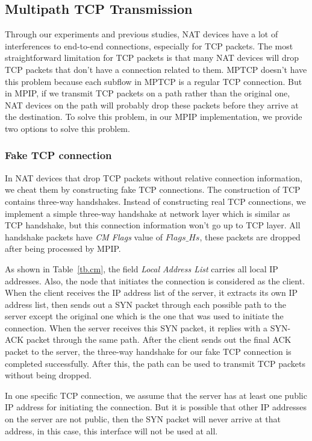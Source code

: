 \subsection{Multipath TCP Transmission}
\label{sec:tcp}
Through our experiments and previous studies\cite{mptcp}, NAT devices have a lot of interferences to end-to-end connections, especially for TCP packets. The most straightforward limitation for TCP packets is that many NAT devices will drop TCP packets that don't have a connection related to them. MPTCP doesn't have this problem because each subflow in MPTCP is a regular TCP connection. But in MPIP, if we transmit TCP packets on a path rather than the original one, NAT devices on the path will probably drop these packets before they arrive at the destination. To solve this problem, in our MPIP implementation, we provide two options to solve this problem.

\subsubsection{Fake TCP connection}
In NAT devices that drop TCP packets without relative connection information, we cheat them by constructing fake TCP connections. The construction of TCP contains three-way handshakes. Instead of constructing real TCP connections, we implement a simple three-way handshake at network layer which is similar as TCP handshake, but this connection information won't go up to TCP layer. All handshake packets have \emph{CM Flags} value of $Flags\_Hs$, these packets are dropped after being processed by MPIP.

As shown in Table~\ref{tb.cm}, the field \emph{Local Address List} carries all local IP addresses. Also, the node that initiates the connection is considered as the client. When the client receives the IP address list of the server, it extracts its own IP address list, then sends out a SYN packet through each possible path to the server except the original one which is the one that was used to initiate the connection. When the server receives this SYN packet, it replies with a SYN-ACK packet through the same path. After the client sends out the final ACK packet to the server, the three-way handshake for our fake TCP connection is completed successfully. After this, the path can be used to transmit TCP packets without being dropped.

In one specific TCP connection, we assume that the server has at least one public IP address for initiating the connection. But it is possible that other IP addresses on the server are not public, then the SYN packet will never arrive at that address, in this case, this interface will not be used at all.

